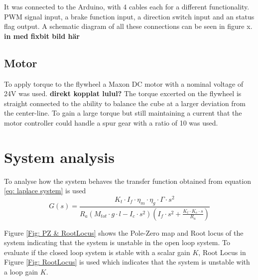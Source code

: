 \documentclass[a4paper,11pt]{kth-mag}
\begin{document}
It was connected to the Arduino, with 4 cables each for a different functionality. PWM signal input, a brake function input, a direction switch input and an status flag output. A schematic diagram of all these connections can be seen in figure x.
\textbf{in med fixbit bild här}


\subsection{Motor}
To apply torque to the flywheel a Maxon DC motor with a nominal voltage of 24V was used. \textbf{direkt kopplat lulul?} The torque excerted on the flywheel is straight connected to the ability to balance the cube at a larger deviation from the center-line. To gain a large torque but still maintaining a current that the motor controller could handle a spur gear with a ratio of 10 was used. 

\section{System analysis}
To analyse how the system behaves the transfer function obtained from equation \ref{eq: laplace system} is used
\begin{equation}\label{eq: transfer function final}
G(s) = \frac{K_t \cdot I_f \cdot \eta_m \cdot \eta_g \cdot \Gamma \cdot s^2}{R_a (M_{tot} \cdot g \cdot l - I_c \cdot s^2)(I_f \cdot s^2 + \frac{K_t \cdot K_e \cdot s}{R_a})} 
\end{equation}

Figure \ref{Fig: PZ & RootLocus} shows the Pole-Zero map and Root locus of the system indicating that the system is unstable in the open loop system. \cite{regler} To evaluate if the closed loop system is stable with a scalar gain $K$, Root Locus in Figure \ref{Fig: RootLocus} is used which indicates that the system is unstable with a loop gain $K$.
\end{document}
